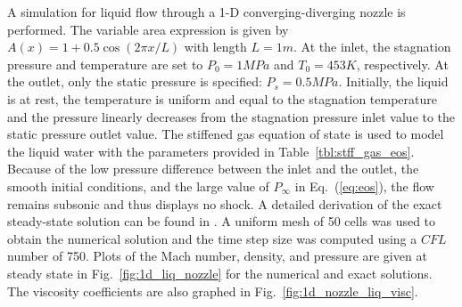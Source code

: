 \documentclass[review,10pt]{elsarticle}
\newcommand{\eqt}[1]{Eq.~(\ref{#1})}                     %
\newcommand{\fig}[1]{Fig.~\ref{#1}}                      %
\newcommand{\tbl}[1]{Table~\ref{#1}}                     %
\begin{document}
A simulation for liquid flow through a 1-D converging-diverging nozzle is performed. The variable area expression is given by 
$A(x) = 1 + 0.5 \cos(2 \pi x / L)$ with length $L=1m$.  At the inlet, the stagnation pressure and temperature are set 
to $P_0 = 1 MPa$ and $T_0 = 453 K$, respectively. At the outlet, only the static pressure is specified: $P_s = 0.5 MPa$. 
Initially, the liquid is at rest, the temperature is uniform and equal to the stagnation temperature and the pressure 
linearly decreases from the stagnation pressure inlet value to the static pressure outlet value. 
The stiffened gas equation of state is used to model the liquid water with the parameters provided in \tbl{tbl:stff_gas_eos}.
Because of the low pressure difference between the inlet and the outlet, the smooth initial conditions, 
and the large value of $P_\infty$ in \eqt{eq:eos}, the flow remains subsonic and thus displays no shock. A detailed 
derivation of the exact steady-state solution can be found in \cite{nozzle_exact}. A uniform mesh of 
50 cells was used to obtain the numerical solution and the time step size was computed using a $CFL$ number of 750.
Plots of the Mach number, density, and pressure are given at steady state in \fig{fig:1d_liq_nozzle} 
for the numerical and exact solutions. The viscosity coefficients are also graphed in \fig{fig:1d_nozzle_liq_visc}. 
%
\end{document}

